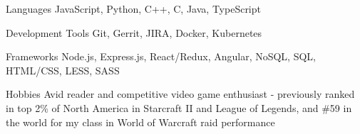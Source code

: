 
\begin{cvskills}
  \cvskill
    {Languages} %
    {JavaScript, Python, C++, C, Java, TypeScript} %

  \cvskill
    {Development Tools} %
    {Git, Gerrit, JIRA, Docker, Kubernetes} %

  \cvskill
    {Frameworks} %
    {Node.js, Express.js, React/Redux, Angular, NoSQL, SQL, HTML/CSS, LESS, SASS} %

  \cvskill
    {Hobbies} %
    {Avid reader and competitive video game enthusiast - previously ranked in top 2\% of
    North America in Starcraft II \linebreak and League of Legends, and \#59 in the
    world for my class in World of Warcraft raid performance}

\end{cvskills}
